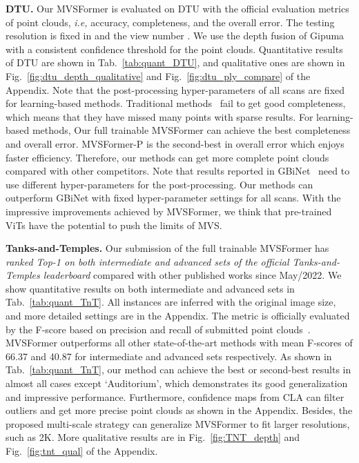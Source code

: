 \documentclass[10pt]{article} \usepackage[preprint]{tmlr}
\begin{document}
\textbf{DTU.} Our MVSFormer is evaluated on DTU with the official evaluation metrics of point clouds, \emph{i.e,} accuracy, completeness, and the overall error. The testing resolution is fixed in  and the view number . We use the depth fusion of Gipuma~\citep{Galliani_2015_ICCV} with a consistent confidence threshold  for the point clouds. Quantitative results of DTU are shown in Tab.~\ref{tab:quant_DTU}, and qualitative ones are shown in Fig.~\ref{fig:dtu_depth_qualitative} and Fig.~\ref{fig:dtu_ply_compare} of the Appendix.
Note that the post-processing hyper-parameters of all scans are fixed for learning-based methods. Traditional methods~\citep{Galliani_2015_ICCV,schonberger2016pixelwise} fail to get good completeness, which means that they have missed many points with sparse results. For learning-based methods, Our full trainable MVSFormer can achieve the best completeness and overall error. MVSFormer-P is the second-best in overall error which enjoys faster efficiency. Therefore, our methods can get more complete point clouds compared with other competitors. Note that results reported in GBiNet~\citep{mi2021generalized} need to use different hyper-parameters for the post-processing. Our methods can outperform GBiNet with fixed hyper-parameter settings for all scans. With the impressive improvements achieved by MVSFormer, we think that pre-trained ViTs have the potential to push the limits of MVS.  


\noindent\textbf{Tanks-and-Temples.} 
Our submission of the full trainable MVSFormer has \emph{ranked Top-1 on both intermediate and advanced sets of the official Tanks-and-Temples leaderboard} compared with other published works since May/2022.
We show quantitative results on both intermediate and advanced sets in Tab.~\ref{tab:quant_TnT}. 
All instances are inferred with the original  image size, and more detailed settings are in the Appendix.
The metric is officially evaluated by the F-score based on precision and recall of submitted point clouds~\citep{Knapitsch2017}. 
MVSFormer outperforms all other state-of-the-art methods with mean F-scores of 66.37 and 40.87 for intermediate and advanced sets respectively.
As shown in Tab.~\ref{tab:quant_TnT}, our method can achieve the best or second-best results in almost all cases except `Auditorium', which demonstrates its good generalization and impressive performance. Furthermore, confidence maps from CLA can filter outliers and get more precise point clouds as shown in the Appendix. Besides, the proposed multi-scale strategy can generalize MVSFormer to fit larger resolutions, such as 2K. More qualitative results are  in Fig.~\ref{fig:TNT_depth} and Fig.~\ref{fig:tnt_qual} of the Appendix.
\end{document}
